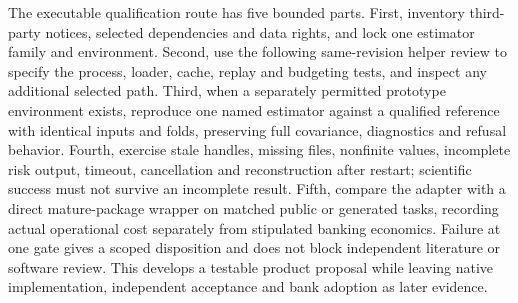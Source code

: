 The executable qualification route has five bounded parts. First, inventory
third-party notices, selected dependencies and data rights, and lock one
estimator family and environment. Second, use the following same-revision helper review to specify the process, loader, cache, replay and budgeting tests, and inspect any additional selected path. Third, when a
separately permitted prototype environment exists, reproduce one named estimator
against a qualified reference with identical inputs and folds, preserving full
covariance, diagnostics and refusal behavior. Fourth, exercise stale handles,
missing files, nonfinite values, incomplete risk output, timeout, cancellation
and reconstruction after restart; scientific success must not survive an
incomplete result. Fifth, compare the adapter with a direct mature-package
wrapper on matched public or generated tasks, recording actual operational
cost separately from stipulated banking economics. Failure at one gate gives
a scoped disposition and does not block independent literature or software
review. This develops a testable product proposal while leaving native
implementation, independent acceptance and bank adoption as later evidence.

